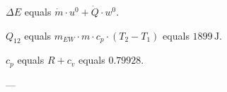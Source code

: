 \( \Delta E \) equals \( \dot{m} \cdot u^0 + \dot{Q} \cdot w^0 \).  

\( Q_{12} \) equals \( m_{EW} \cdot m \cdot c_p \cdot (T_2 - T_1) \) equals \( 1899 \, \text{J} \).  

\( c_p \) equals \( R + c_v \) equals \( 0.79928 \).  

---